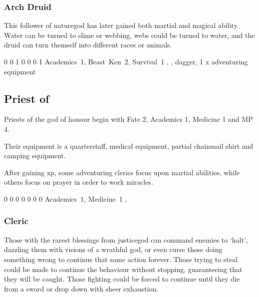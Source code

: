 {\begin{multicols}{2}
\subsubsection{Arch Druid}

This follower of \gls{naturegod} has later gained both martial and magical ability.
Water can be turned to slime or webbing, webs could be turned to water, and the druid can turn themself into different races or animals.


{0}%
{0}%
{{1}%
{0}%
{0}}%
{0}%
{1}%
{Academics~1, Beast~Ken~2, Survival~1}%
{\spear, \partialleather, dagger, 1 x adventuring equipment}%
{}

\subsection{Priest of }

Priests of the god of honour begin with Fate 2, Academics 1, Medicine 1 and MP 4.

Their equipment is a quarterstaff, medical equipment, partial chainmail shirt and camping equipment.

After gaining \gls{xp}, some adventuring clerics focus upon martial abilities, while others focus on prayer in order to work miracles.


{0}%
{0}%
{{0}%
{0}%
{0}}%
{0}%
{0}%
{Academics~1, Medicine~1}%
{\quarterstaff, \partialleather}%
{}

\subsubsection{Cleric}

Those with the rarest blessings from \gls{justicegod} can command enemies to `halt', dazzling them with visions of a wrathful god, or even curse those doing something wrong to continue that same action forever.
Those trying to steal could be made to continue the behaviour without stopping, guaranteeing that they will be caught.
Those fighting could be forced to continue until they die from a sword or drop down with sheer exhaustion.


\end{multicols}}
